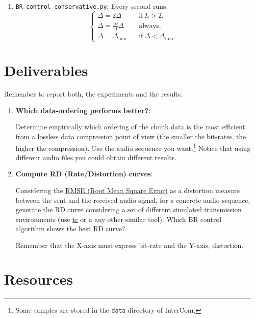 \begin{enumerate}
\item \verb|BR_control_conservative.py|: Every second runs:
  \begin{equation}
    \left\{
    \begin{array}{ll}
      \Delta = 2\Delta & \quad\text{if}~L>2, \\
      \Delta = \frac{10}{11}\Delta & \quad\text{always}, \\
      \Delta = \Delta_{\text{min}} & \quad\text{if}~\Delta < \Delta_{\text{min}}.
    \end{array}
    \right.
  \end{equation}
\end{enumerate}


\section{Deliverables}

Remember to report both, the experiments and the results.
\begin{enumerate}
\item \textbf{Which data-ordering performs better?}:
  
Determine empirically which ordering of the chunk data is the most
efficient from a lossless data compression point of view (the smaller
the bit-rates, the higher the compression). Use the audio sequence you
want.\footnote{Some samples are stored in the \texttt{data} directory of
  InterCom.} Notice that using different audio files you could obtain
different results.


\item \textbf{Compute RD (Rate/Distortion) curves}:
  
Considering the
\href{https://en.wikipedia.org/wiki/Root-mean-square_deviation}{RMSE
  (Root Mean Square Error)} as a distortion measure between the sent
and the received audio signal, for a concrete audio sequence,
generate the RD curve considering a set of different simulated
transmission environments (use
\href{https://vicente-gonzalez-ruiz.github.io/about_tc/}{tc} or a
any other similar tool). Which BR control algorithm shows the best RD curve?

Remember that the X-axis must express bit-rate and the Y-axis, distortion.

\end{enumerate}


\section{Resources}


